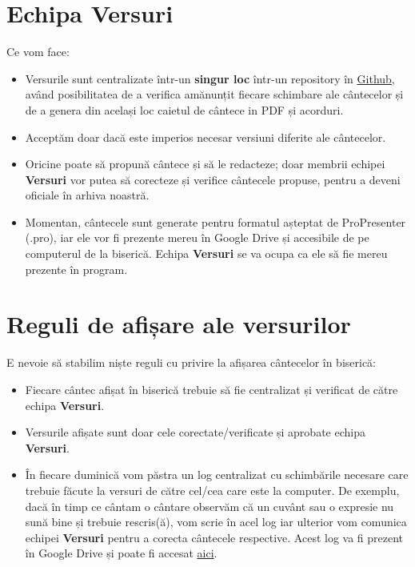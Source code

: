 \documentclass[epjST]{svjour}
\begin{document}
  \section{Echipa Versuri}
  \label{sec:4} Ce vom face:
  \begin{itemize}
    \item Versurile sunt centralizate într-un \textbf{singur loc} într-un
      repository în \href{https://github.com/ioanlucut/bes-lyrics}{Github}, având
      posibilitatea de a verifica amănunțit fiecare schimbare ale cântecelor și de
      a genera din același loc caietul de cântece in PDF și acorduri.

    \item Acceptăm doar dacă este imperios necesar versiuni diferite ale cântecelor.

    \item Oricine poate să propună cântece și să le redacteze; doar membrii
      echipei \textbf{Versuri} vor putea să corecteze și verifice cântecele propuse,
      pentru a deveni oficiale în arhiva noastră.

    \item Momentan, cântecele sunt generate pentru formatul așteptat de
      ProPresenter (.pro), iar ele vor fi prezente mereu în Google Drive și
      accesibile de pe computerul de la biserică. Echipa \textbf{Versuri} se va
      ocupa ca ele să fie mereu prezente în program.
  \end{itemize}

  \section{Reguli de afișare ale versurilor}
  \label{sec:5} E nevoie să stabilim niște reguli cu privire la afișarea cântecelor
  în biserică:
  \begin{itemize}
    \item Fiecare cântec afișat în biserică trebuie să fie centralizat și verificat
      de către echipa \textbf{Versuri}.

    \item Versurile afișate sunt doar cele corectate/verificate și aprobate echipa
      \textbf{Versuri}.

    \item În fiecare duminică vom păstra un log centralizat cu schimbările necesare
      care trebuie făcute la versuri de către cel/cea care este la computer. De
      exemplu, dacă în timp ce cântam o cântare observăm că un cuvânt sau o expresie
      nu sună bine și trebuie rescris(ă), vom scrie în acel log iar ulterior vom
      comunica echipei \textbf{Versuri} pentru a corecta cântecele respective. Acest
      log va fi prezent în Google Drive și poate fi accesat \href{https://docs.google.com/spreadsheets/d/1-YsjtGIwzpnJNoVPZ4vhv8DvmeUYrmwuhKL6a5BtzXc/edit?usp=drive_link}{aici}.
  \end{itemize}
\end{document}
